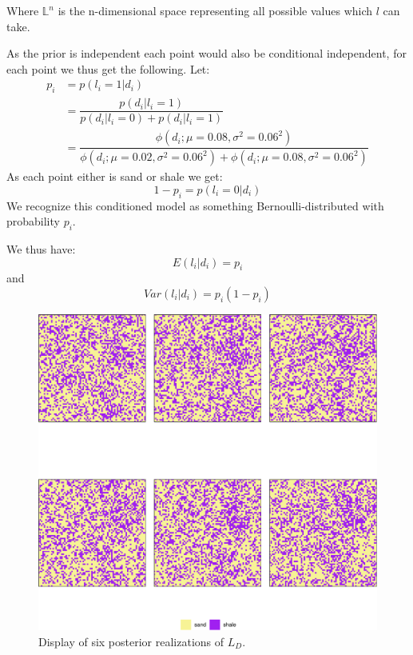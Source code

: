 \documentclass[]{article}
\begin{document}
Where \(\mathbb{L}^n\) is the n-dimensional space representing all
possible values which \(l\) can take.

As the prior is independent each point would also be conditional
independent, for each point we thus get the following. Let:
\begin{equation}
\begin{split}
p_i &= p(l_i = 1 | d_i) 
\\ &= \dfrac{p(d_i | l_i = 1)}{p(d_i | l_i = 0) + p(d_i | l_i = 1)}
\\ &= \dfrac{\phi(d_i  ; \mu = 0.08, \sigma^2 = 0.06^2)}{\phi(d_i  ; \mu = 0.02, \sigma^2 = 0.06^2) + \phi(d_i  ; \mu = 0.08, \sigma^2 = 0.06^2)}
\end{split}
\end{equation} As each point either is sand or shale we get:
\begin{equation}
1 - p_i = p(l_i = 0 | d_i)
\end{equation} We recognize this conditioned model as something
Bernoulli-distributed with probability \(p_i\).

We thus have: \begin{equation}
E(l_i | d_i) = p_i
\end{equation} and \begin{equation} \label{eq:var}
Var(l_i | d_i) = p_i(1-p_i)
\end{equation}

\begin{figure}
\centering
\includegraphics{Exercise-3_files/figure-latex/fig1b2-1.pdf}
\caption{\label{fig:1b2} Display of six posterior realizations of
\(L_D\).}
\end{figure}
\end{document}
